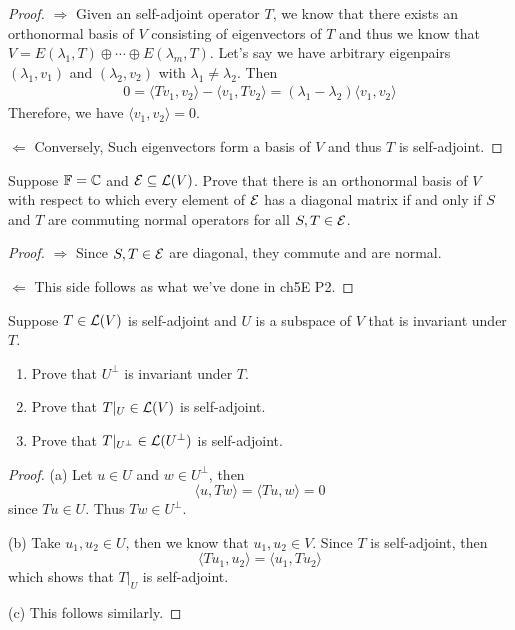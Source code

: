 \documentclass{extarticle}
\begin{document}
\begin{proof}
\(\Rightarrow\) Given an self-adjoint operator \(T\), we know that there exists an orthonormal basis 
of \(V\) consisting of eigenvectors of \(T\) and thus we know that \(V = E(\lambda_1, T) \oplus 
\cdots \oplus E(\lambda_m, T)\). Let's say we have arbitrary eigenpairs \((\lambda_1, v_1)\) and 
\((\lambda_2, v_2)\) with \(\lambda_1 \neq \lambda_2\). Then 
\begin{align*}
    0 = \langle Tv_1,v_2 \rangle - \langle v_1,Tv_2 \rangle 
    = (\lambda_1 - \lambda_2) \langle v_1,v_2 \rangle
\end{align*}
Therefore, we have \(\langle v_1,v_2 \rangle = 0\). 

\(\Leftarrow\) Conversely, Such eigenvectors form a basis of \(V\) and thus \(T\) is self-adjoint. 
\end{proof}

\begin{problem}{16}
    Suppose \(\mathbb{F} = \mathbb{C}\) and \(\mathcal{E} \subseteq \mathcal{L}(V)\). Prove that there is an orthonormal basis of 
    \(V\) with respect to which every element of \(\mathcal{E}\) has a diagonal matrix if and only if 
    \(S\) and \(T\) are commuting normal operators for all \(S, T \in \mathcal{E}\).
\end{problem}

\begin{proof}
\(\Rightarrow\) Since \(S, T \in \mathcal{E}\) are diagonal, they commute and are normal. 

\(\Leftarrow\) This side follows as what we've done in ch5E P2.
\end{proof}

\begin{problem}{19}
    Suppose \(T \in \mathcal{L}(V)\) is self-adjoint and \(U\) is a subspace of \(V\) that is invariant 
    under \(T\). 
    \begin{enumerate}[label=(\alph*)]
        \item Prove that \(U^\perp\) is invariant under \(T\). 
        \item Prove that \(T|_U \in \mathcal{L}(V)\) is self-adjoint. 
        \item Prove that \(T |_{U^\perp} \in \mathcal{L}(U^\perp)\) is self-adjoint.
    \end{enumerate}
\end{problem}

\begin{proof}
(a) Let \(u \in U\) and \(w \in U^\perp\), then 
\[\langle u,Tw \rangle = \langle Tu,w \rangle = 0\]
since \(Tu \in U\). Thus \(Tw \in U^\perp\).

(b) Take \(u_1, u_2 \in U\), then we know that \(u_1, u_2 \in V\). Since \(T\) is self-adjoint, then 
\[\langle Tu_1, u_2 \rangle = \langle u_1,Tu_2 \rangle\]
which shows that \(T|_U\) is self-adjoint. 

(c) This follows similarly.
\end{proof}
\end{document}
